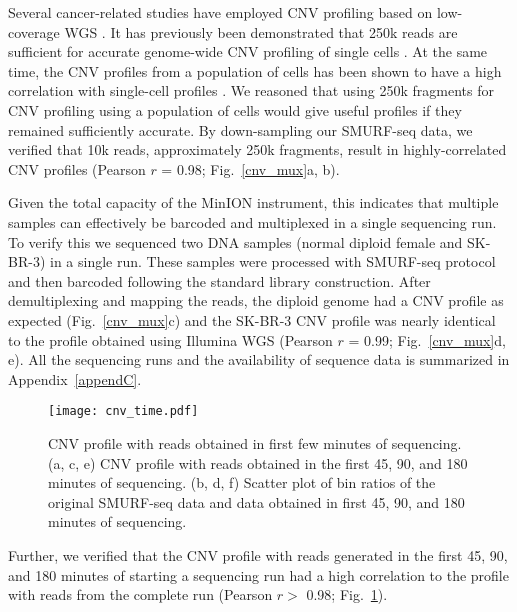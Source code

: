 Several cancer-related studies have employed CNV profiling based on
low-coverage WGS \citep{macintyre2018copy,kader2016copy}.  It has
previously been demonstrated that 250k reads are sufficient for accurate
genome-wide CNV profiling of single cells \citep{baslan2015optimizing}.
At the same time, the CNV profiles from a population of cells has been
shown to have a high correlation with single-cell profiles
\citep{navin2011tumour,baslan2015optimizing}. We reasoned that using 250k
fragments for CNV profiling using a population of cells would give
useful profiles if they remained sufficiently accurate.  By
down-sampling our SMURF-seq data, we verified that 10k reads,
approximately 250k fragments, result in highly-correlated CNV profiles
(Pearson $r$ = 0.98; Fig.~\ref{cnv_mux}a, b).

Given the total capacity of the MinION instrument, this indicates that
multiple samples can effectively be barcoded and multiplexed in a single
sequencing run.
To verify this we sequenced two DNA samples (normal diploid female and
SK-BR-3) in a single run.  These samples were processed with SMURF-seq
protocol and then barcoded following the standard library construction.
After demultiplexing and mapping the reads, the diploid genome had a CNV
profile as expected (Fig.~\ref{cnv_mux}c) and the SK-BR-3 CNV profile
was nearly identical to the profile obtained using Illumina WGS (Pearson
$r$ = 0.99; Fig.~\ref{cnv_mux}d, e). All the sequencing runs and the
availability of sequence data is summarized in Appendix~\ref{appendC}.

\begin{figure}[t!]
\centering
\texttt{[image: cnv\_time.pdf]}
\caption[CNV profile with reads obtained in first few minutes of
  sequencing]{
  CNV profile with reads obtained in first few minutes of sequencing.
  (a, c, e) CNV profile  with reads obtained in the first 45, 90,
  and 180 minutes of sequencing.
  (b, d, f) Scatter plot of bin ratios of the original
  SMURF-seq data and data obtained in first 45, 90, and 180
  minutes of sequencing.}
  \label{cnv_time}
\end{figure}

Further, we verified that the CNV profile with reads generated in the
first 45, 90, and 180 minutes of starting a sequencing run had a high
correlation to the profile with reads from the complete run (Pearson $r>$
0.98; Fig.~\ref{cnv_time}).

